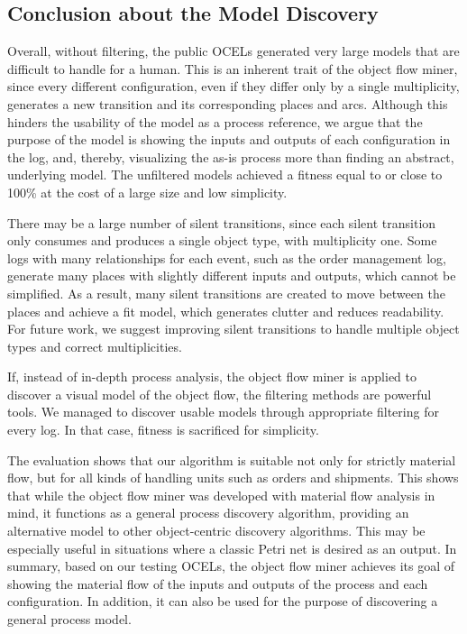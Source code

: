 \subsection{Conclusion about the Model Discovery}



Overall, without filtering, the public OCELs generated very large models that are difficult to handle for a human.
This is an inherent trait of the object flow miner, since every different configuration, even if they differ only by a single multiplicity, generates a new transition and its corresponding places and arcs.
Although this hinders the usability of the model as a process reference, we argue that the purpose of the model is showing the inputs and outputs of each configuration in the log, and, thereby, visualizing the as-is process more than finding an abstract, underlying model.
The unfiltered models achieved a fitness equal to or close to 100\% at the cost of a large size and low simplicity.



There may be a large number of silent transitions, since each silent transition only consumes and produces a single object type, with multiplicity one.
Some logs with many relationships for each event, such as the order management log, generate many places with slightly different inputs and outputs, which cannot be simplified.
As a result, many silent transitions are created to move between the places and achieve a fit model, which generates clutter and reduces readability.
For future work, we suggest improving silent transitions to handle multiple object types and correct multiplicities.



If, instead of in-depth process analysis, the object flow miner is applied to discover a visual model of the object flow, the filtering methods are powerful tools.
We managed to discover usable models through appropriate filtering for every log.
In that case, fitness is sacrificed for simplicity.



The evaluation shows that our algorithm is suitable not only for strictly material flow, but for all kinds of handling units such as orders and shipments.
This shows that while the object flow miner was developed with material flow analysis in mind, it functions as a general process discovery algorithm, providing an alternative model to other object-centric discovery algorithms.
This may be especially useful in situations where a classic Petri net is desired as an output.
In summary, based on our testing OCELs, the object flow miner achieves its goal of showing the material flow of the inputs and outputs of the process and each configuration.
In addition, it can also be used for the purpose of discovering a general process model.



